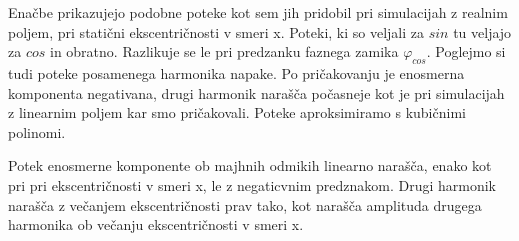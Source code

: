 Enačbe prikazujejo podobne poteke kot sem jih pridobil pri simulacijah z realnim poljem, pri statični ekscentričnosti v smeri x. Poteki, ki so veljali za $sin$ tu veljajo za $cos$ in obratno. Razlikuje se le pri predzanku faznega zamika $\varphi_{cos}$. Poglejmo si tudi poteke posamenega harmonika napake. Po pričakovanju je enosmerna komponenta negativana, drugi harmonik narašča počasneje kot je pri simulacijah z linearnim poljem kar smo pričakovali. Poteke aproksimiramo s kubičnimi polinomi.


Potek enosmerne komponente ob majhnih odmikih linearno narašča, enako kot pri pri ekscentričnosti v smeri x, le z negaticvnim predznakom. Drugi harmonik narašča z večanjem ekscentričnosti prav tako, kot narašča amplituda drugega harmonika ob večanju ekscentričnosti v smeri x.

